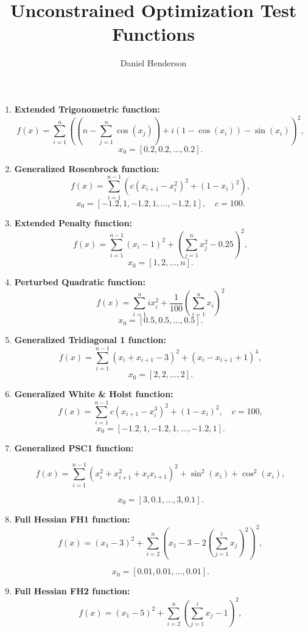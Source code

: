 \documentclass[10pt]{article}
\title{Unconstrained Optimization Test Functions}
\author{Daniel Henderson}
\begin{document}
\begin{enumerate}
    \item \textbf{Extended Trigonometric function:}
    \[
    f(x) = \sum_{i=1}^{n} \left( (n - \sum_{j=1}^{n} \cos(x_j)) + i \left( 1 - \cos(x_i) \right) - \sin(x_i) \right)^2,
    \]
    \[
    x_0 = [0.2, 0.2, \dots, 0.2].
    \]


    \item \textbf{Generalized Rosenbrock function:}
    \[
    f(x) = \sum_{i=1}^{n-1} \left( c(x_{i+1} - x_i^2)^2 + (1 - x_i)^2 \right),
    \]
    \[
    x_0 = [-1.2, 1, -1.2, 1, \dots, -1.2, 1], \quad c = 100.
    \]

    \item \textbf{Extended Penalty function:}
    \[
    f(x) =  \sum_{i=1}^{n-1} (x_i - 1)^2 + \left(\sum_{j=1}^{n}  x_j^2 - 0.25 \right)^2,
    \]
    \[
    x_0 = [1, 2, \dots, n].
    \]

    \item \textbf{Perturbed Quadratic function:}
    \[
    f(x) = \sum_{i=1}^{n} i x_i^2 + \frac{1}{100}\left(\sum_{i=1}^{n} x_i \right)^2
    \]
    \[
    x_0 = [0.5, 0.5, \dots, 0.5].
    \]

    \item \textbf{Generalized Tridiagonal 1 function:}
    \[
    f(x) = \sum_{i=1}^{n-1} ( x_i +  x_{i+1} - 3)^2 + (x_{i} - x_{i+1} + 1)^4,
    \]
    \[
    x_0 = [2, 2, \dots, 2].
    \]

    \item \textbf{Generalized White \& Holst function:}
    \[
    f(x) = \sum_{i=1}^{n-1} c(x_{i+1} - x_i^3)^2 + (1 - x_i)^2 , \quad c = 100,
    \]
    \[
    x_0 = [-1.2, 1, -1.2, 1, \dots, -1.2, 1].
    \]

    \item \textbf{Generalized PSC1 function:}

    \[
    f(x) = \sum_{i=1}^{n-1} \left( x_i^2 + x_{i+1}^2 + x_{i} x_{i+1} \right)^2 + \sin^2(x_{i}) + \cos^2(x_{i}),
    \]
    
    \[
    x_0 = [3, 0.1, \ldots, 3, 0.1].
    \]

    \item \textbf{Full Hessian FH1 function:}
    \[
    f(x) = (x_1 - 3)^2 + \sum_{i=2}^n \left( x_1 - 3 - 2\left( \sum_{j=1}^i x_j \right)^2 \right)^2,
    \]

    \[
    x_0 = [0.01, 0.01, \ldots, 0.01].
    \]

    \item \textbf{Full Hessian FH2 function:}
    \[
    f(x) = (x_1 - 5)^2 + \sum_{i=2}^n \left(\sum_{j=1}^i x_j - 1 \right)^2,
    \]


\end{enumerate}
\end{document}
